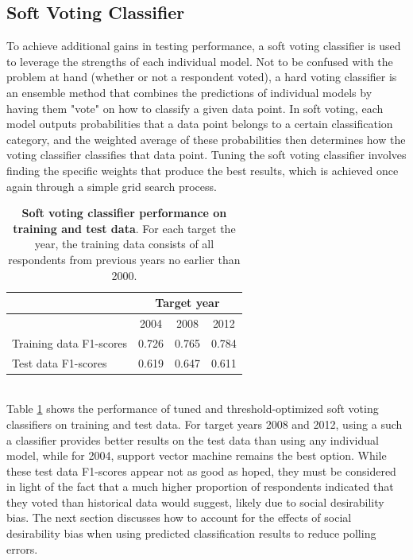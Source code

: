 \documentclass{article}
\begin{document}
	\subsection{Soft Voting Classifier}
	
	To achieve additional gains in testing performance, a soft voting classifier is used to leverage the strengths of each individual model. Not to be confused with the problem at hand (whether or not a respondent voted), a hard voting classifier is an ensemble method that combines the predictions of individual models by having them "vote" on how to classify a given data point. In soft voting, each model outputs probabilities that a data point belongs to a certain classification category, and the weighted average of these probabilities then determines how the voting classifier classifies that data point. Tuning the soft voting classifier involves finding the specific weights that produce the best results, which is achieved once again through a simple grid search process.
	\begin{table}[h]
		\begin{tabular}{|m{4cm}|m{1cm}|m{1cm}|m{1cm}|}
			\hline &
			\multicolumn{3}{|c|}{Target year} \\
			\hline &
			\multicolumn{1}{|c|}{2004} &
			\multicolumn{1}{|c|}{2008} &
			\multicolumn{1}{|c|}{2012} \\
			\hline
			Training data F1-scores & 0.726 & 0.765 & 0.784
			\\ \hline
			Test data F1-scores & 0.619 & 0.647 & 0.611
			\\ \hline
		\end{tabular}
		\caption{\textbf{Soft voting classifier performance on training and test data}. For each target the year, the training data consists of all respondents from previous years no earlier than 2000.}
		\label{table:soft_voting_results}
	\end{table}
	\hfill \\
	Table \ref{table:soft_voting_results} shows the performance of tuned and threshold-optimized soft voting classifiers on training and test data. For target years 2008 and 2012, using a such a classifier provides better results on the test data than using any individual model, while for 2004, support vector machine remains the best option. While these test data F1-scores appear not as good as hoped, they must be considered in light of the fact that a much higher proportion of respondents indicated that they voted than historical data would suggest, likely due to social desirability bias. The next section discusses how to account for the effects of social desirability bias when using predicted classification results to reduce polling errors.
	
\end{document}
